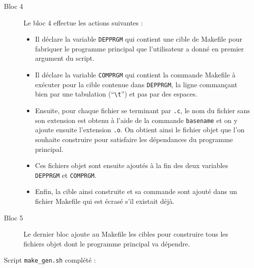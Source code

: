 \documentclass[10pt]{article}
\begin{document}
\begin{enumerate}[label=\textbf{[\alph*]}]
\begin{description}
  \item [Bloc 4] Le bloc 4 effectue les actions suivantes :
    \begin{itemize}
    \item Il déclare la variable \texttt{DEPPRGM} qui
      contient une cible de Makefile pour fabriquer le programme principal que
      l'utilisateur a donné en premier argument du script.

    \item Il déclare la variable \texttt{COMPRGM} qui contient la commande
      Makefile à exécuter pour la
      cible contenue dans \texttt{DEPPRGM}, la ligne commançant bien par une
      tabulation (``\verb|\t|'') et pas par des espaces.

    \item Ensuite, pour chaque fichier se terminant par \texttt{.c}, le nom du
      fichier
      sans son extension est obtenu à l'aide de la commande \texttt{basename} et
      on y ajoute ensuite l'extension \texttt{.o}. On obtient ainsi le fichier
      objet que l'on souhaite construire pour satisfaire les dépendances du
      programme principal.

    \item Ces fichiers objet sont ensuite ajoutés à la fin des deux variables
      \texttt{DEPPRGM} et \texttt{COMPRGM}.

    \item Enfin, la cible ainsi construite et sa commande sont ajouté dans un
      fichier
      Makefile qui est écrasé s'il existait déjà.
    \end{itemize}

  \item [Bloc 5] Le dernier bloc ajoute au Makefile les cibles pour construire
    tous les fichiers objet dont le programme principal va dépendre.

  \end{description}

\newpage

\item Script \texttt{make\_gen.sh} complété :

  

\end{enumerate}
\end{document}
